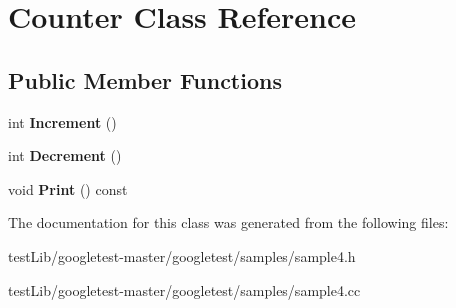 \hypertarget{classCounter}{}\section{Counter Class Reference}
\label{classCounter}
\subsection*{Public Member Functions}
\begin{DoxyCompactItemize}
\item 
\mbox{\label{classCounter_a0a0ca9fdb580a2aec9a5a62ebed2b5ab}} 
int {\bfseries Increment} ()
\item 
\mbox{\label{classCounter_aa58d9b4f0bd96fc2331234493eb21bed}} 
int {\bfseries Decrement} ()
\item 
\mbox{\label{classCounter_a80092ec2a0deea0870b2e9f8ad0906bd}} 
void {\bfseries Print} () const
\end{DoxyCompactItemize}


The documentation for this class was generated from the following files\+:\begin{DoxyCompactItemize}
\item 
test\+Lib/googletest-\/master/googletest/samples/sample4.\+h\item 
test\+Lib/googletest-\/master/googletest/samples/sample4.\+cc\end{DoxyCompactItemize}
